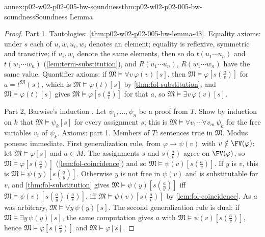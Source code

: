 \begin{annexitem}{annex:p02-w02-p02-005-bw-soundness}{thm:p02-w02-p02-005-bw-soundness}{Soundness Lemma}
\begin{proof}
Part 1.  Tautologies: \cref{thm:p02-w02-p02-005-bw-lemma-43}.  Equality
axioms: under \(s\) each of \(u,w,u_i,w_i\) denotes an element; equality
is reflexive, symmetric and transitive; if \(u_i,w_i\) denote the same
elements, then so do \(t(u_1\cdots u_n)\) and \(t(w_1\cdots w_n)\)
(\cref{lem:term-substitution}), and \(R(u_1\cdots u_n)\),
\(R(w_1\cdots w_n)\) have the same value.  Quantifier axioms: if
\(\mathfrak M\models\forall v\,\varphi(v)[s]\), then
\(\mathfrak M\models\varphi[s(\tfrac{a}{v})]\) for
\(a=t^{\mathfrak M}(s)\), which is \(\mathfrak M\models\varphi(t)[s]\) by
\cref{thm:fol-substitution}; and \(\mathfrak M\models\varphi(t)[s]\) gives
\(\mathfrak M\models\varphi[s(\tfrac av)]\) for that \(a\), so
\(\mathfrak M\models\exists v\,\varphi(v)[s]\).

Part 2, Barwise's induction \cite[ch.~A.1, \S4, 4.10, p.~35]{Barwise1977FirstOrder}.
Let \(\psi_1,\ldots,\psi_n\) be a proof from \(T\).  Show by induction on
\(k\) that \(\mathfrak M\models\psi_k[s]\) for every assignment \(s\);
this is \(\mathfrak M\models\forall v_1\cdots\forall v_m\,\psi_k\) for the
free variables \(v_i\) of \(\psi_k\).  Axioms: part 1.  Members of \(T\):
sentences true in \(\mathfrak M\).  Modus ponens: immediate.  First
generalization rule, from \(\varphi\to\psi(v)\) with \(v\notin\FV(\varphi)\):
let \(\mathfrak M\models\varphi[s]\) and \(a\in M\).  The assignments
\(s\) and \(s(\tfrac av)\) agree on \(\FV(\varphi)\), so
\(\mathfrak M\models\varphi[s(\tfrac av)]\) (\cref{lem:fol-coincidence}) and
so \(\mathfrak M\models\psi(v)[s(\tfrac av)]\).  If \(y\) is \(v\), this is
\(\mathfrak M\models\psi(y)[s(\tfrac ay)]\).  Otherwise \(y\) is not free
in \(\psi(v)\) and is substitutable for \(v\), and
\cref{thm:fol-substitution} gives \(\mathfrak M\models\psi(y)[s(\tfrac ay)]\)
iff \(\mathfrak M\models\psi(v)[s(\tfrac ay)(\tfrac av)]\), iff
\(\mathfrak M\models\psi(v)[s(\tfrac av)]\) by \cref{lem:fol-coincidence}.
As \(a\) was arbitrary, \(\mathfrak M\models\forall y\,\psi(y)[s]\).  The
second generalization rule is dual: if
\(\mathfrak M\models\exists y\,\psi(y)[s]\), the same computation gives
\(a\) with \(\mathfrak M\models\psi(v)[s(\tfrac av)]\), hence
\(\mathfrak M\models\varphi[s(\tfrac av)]\) and
\(\mathfrak M\models\varphi[s]\).
\end{proof}
\end{annexitem}

